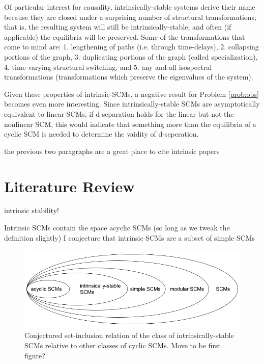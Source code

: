 \documentclass[letterpaper,10pt]{article}
\begin{document}
Of particular interest for causality, intrinsically-stable systems derive their name because they are closed under a surprising number of structural transformations; that is, the resulting system will still be intrinsically-stable, and often (if applicable) the equilibria will be preserved. Some of the transformations that come to mind are: 1. lengthening of paths (i.e. through time-delays), 2. collapsing portions of the graph, 3. duplicating portions of the graph (called specialization), 4. time-varying structural switching, and 5. any and all isospectral transformations (transformations which preserve the eigenvalues of the system).

Given these properties of intrinsic-SCMs, a negative result for Problem \ref{prob:obs} becomes even more interesting. Since intrinsically-stable SCMs are asymptotically equivalent to linear SCMs, if d-separation holds for the linear but not the nonlinear SCM, this would indicate that something more than the equilibria of a cyclic SCM is needed to determine the vaidity of d-seperation. 

\color{red} the previous two paragraphs are a great place to cite intrinsic papers \color{black}

\section{Literature Review}

intrinsic stability!

Intrinsic SCMs contain the space acyclic SCMs (so long as we tweak the definition slightly)
I conjecture that intrinsic SCMs are a subset of simple SCMs

\begin{figure}
\centering
\includegraphics[width=.6\linewidth]{pics/my_own/set_inclusion.png}
\caption{Conjectured set-inclusion relation of the class of intrinsically-stable SCMs relative to other classes of cyclic SCMs. \color{red}Move to be first figure?\color{black}}
\label{fig:set-inclusion}
\end{figure}
\end{document}
